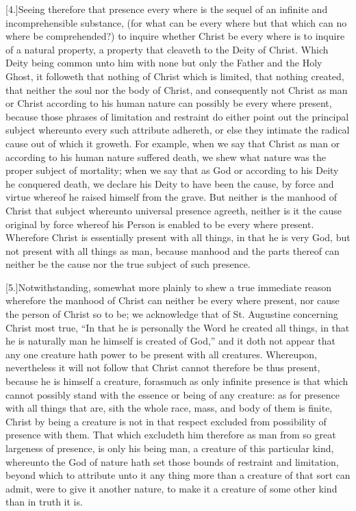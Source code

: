 [4.]Seeing therefore that presence every where is the sequel of an infinite and incomprehensible substance, (for what can be every where but that which can no where be comprehended?) to inquire whether Christ be every where is to inquire of a natural property, a property that cleaveth to the Deity of Christ. Which Deity being common unto him with none but only the Father and the Holy Ghost, it followeth that nothing  of Christ which is limited,
 that nothing created, that neither the soul nor the body of Christ, and consequently not Christ as man or Christ according to his human nature can possibly be every where present, because those phrases of limitation and restraint do either point out the principal subject whereunto every such attribute adhereth, or else they intimate the radical cause out of which it groweth. For example, when we say that Christ as man or according to his human nature suffered death, we shew what nature was the proper subject of mortality; when we say that as God or according to his Deity he conquered death, we declare his Deity to have been the cause, by force and virtue whereof he raised himself from the grave. But neither is the manhood of Christ that subject whereunto universal presence agreeth, neither is it the cause original by force whereof his Person is enabled to be every where present. Wherefore Christ is essentially present with all things, in that he is very God, but not present with all things as man, because manhood and the parts thereof can neither be the cause nor the true subject of such presence.

[5.]Notwithstanding, somewhat more plainly to shew a true immediate reason wherefore the manhood of Christ can neither be every where present, nor cause the person of Christ so to be; we acknowledge that of St. Augustine concerning Christ most true, “In that he is personally the Word he created all things, in that he is naturally man he himself is created of God,” and it doth not appear that any one creature hath power to be present with all creatures. Whereupon, nevertheless it will not follow that Christ cannot therefore be thus present, because he is himself a creature, forasmuch as only infinite presence is that which cannot possibly stand with the essence or being of any creature: as for presence with all things that are, sith the whole race, mass, and body  of them is finite, Christ by being a creature is not in that respect excluded from possibility of presence with them.
 That which excludeth him therefore as man from so great largeness of presence, is only his being man, a creature of this particular kind, whereunto the God of nature hath set those bounds of restraint and limitation, beyond which to attribute unto it any thing more than a creature of that sort can admit, were to give it another nature, to make it a creature of some other kind than in truth it is.

